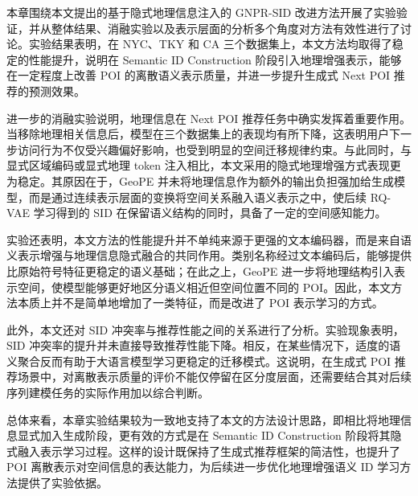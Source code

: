 本章围绕本文提出的基于隐式地理信息注入的 GNPR-SID 改进方法开展了实验验证，并从整体结果、消融实验以及表示层面的分析多个角度对方法有效性进行了讨论。实验结果表明，在 NYC、TKY 和 CA 三个数据集上，本文方法均取得了稳定的性能提升，说明在 Semantic ID Construction 阶段引入地理增强表示，能够在一定程度上改善 POI 的离散语义表示质量，并进一步提升生成式 Next POI 推荐的预测效果。

进一步的消融实验说明，地理信息在 Next POI 推荐任务中确实发挥着重要作用。当移除地理相关信息后，模型在三个数据集上的表现均有所下降，这表明用户下一步访问行为不仅受兴趣偏好影响，也受到明显的空间迁移规律约束。与此同时，与显式区域编码或显式地理 token 注入相比，本文采用的隐式地理增强方式表现更为稳定。其原因在于，GeoPE 并未将地理信息作为额外的输出负担强加给生成模型，而是通过连续表示层面的变换将空间关系融入语义表示之中，使后续 RQ-VAE 学习得到的 SID 在保留语义结构的同时，具备了一定的空间感知能力。

实验还表明，本文方法的性能提升并不单纯来源于更强的文本编码器，而是来自语义表示增强与地理信息隐式融合的共同作用。类别名称经过文本编码后，能够提供比原始符号特征更稳定的语义基础；在此之上，GeoPE 进一步将地理结构引入表示空间，使模型能够更好地区分语义相近但空间位置不同的 POI。因此，本文方法本质上并不是简单地增加了一类特征，而是改进了 POI 表示学习的方式。

此外，本文还对 SID 冲突率与推荐性能之间的关系进行了分析。实验现象表明，SID 冲突率的提升并未直接导致推荐性能下降。相反，在某些情况下，适度的语义聚合反而有助于大语言模型学习更稳定的迁移模式。这说明，在生成式 POI 推荐场景中，对离散表示质量的评价不能仅停留在区分度层面，还需要结合其对后续序列建模任务的实际作用加以综合判断。

总体来看，本章实验结果较为一致地支持了本文的方法设计思路，即相比将地理信息显式加入生成阶段，更有效的方式是在 Semantic ID Construction 阶段将其隐式融入表示学习过程。这样的设计既保持了生成式推荐框架的简洁性，也提升了 POI 离散表示对空间信息的表达能力，为后续进一步优化地理增强语义 ID 学习方法提供了实验依据。
